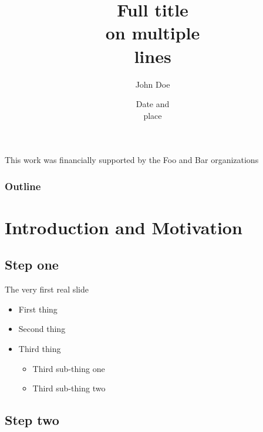 \documentclass{beamer}
\title[Title visible on the lower-right corner] %
{ Full title \\ on multiple \\ lines} %
\author[\insertframenumber / \inserttotalframenumber \hspace{4cm} John Doe et al.] %
{ John Doe }%
\date[] %
{Date and \\ place \vspace{-0.25cm}} %
\theoremstyle{plain}
\theoremstyle{definition}
\theoremstyle{definition}
\begin{document}

\begin{frame}
  \titlepage
  
 { \begin{spacing}{0.5}
\begin{tiny}
  This work was financially supported by the Foo and Bar organizations 
  \end{tiny}\end{spacing} } %
  
\end{frame}

\begin{frame}
   \frametitle{Outline}
   \tableofcontents
\end{frame}

\section{Introduction and Motivation}
\subsection{Step one}

\begin{frame}{The very first real slide}	
\begin{small}

\begin{itemize}
\item First thing
\item Second thing
\item Third thing
{\LARGE 
\begin{itemize}
\item Third sub-thing one
\item Third sub-thing two
\end{itemize}}

\end{itemize}\vspace{.15cm}

\end{small}
\end{frame}

\subsection{Step two}
\end{document}
